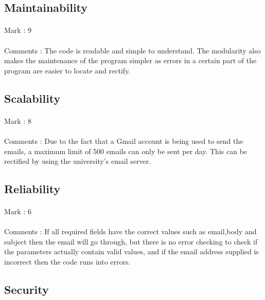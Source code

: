 \documentclass[11pt]{article}
\begin{document}
\subsection{Maintainability}
\paragraph{} Mark : 9
\paragraph{} Comments : The code is readable and simple to understand. The modularity also makes the maintenance of the program simpler as errors in a certain part of the program are easier to locate and rectify. 

\subsection{Scalability}
\paragraph{} Mark : 8
\paragraph{} Comments : Due to the fact that a Gmail account is being used to send the emails, a maximum limit of 500 emails can only be sent per day. This can be rectified by using the university's email server.

\subsection{Reliability}
\paragraph{} Mark : 6
\paragraph{} Comments : If all required fields have the correct values such as email,body and subject then the email will go through, but there is no error checking to check if the parameters actually contain valid values, and if the email address supplied is incorrect then the code runs into errors.

\subsection{Security}
\end{document}

